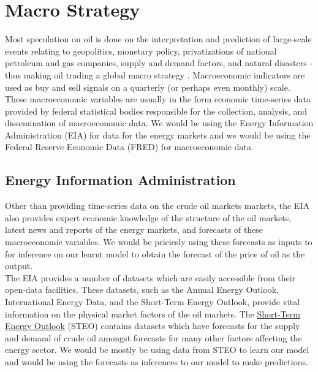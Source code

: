 \section{Macro Strategy}

Most speculation on oil is done on the interpretation and prediction of large-scale events relating to geopolitics, monetary policy, privatizations of national petroleum and gas companies, supply and demand factors, and natural disasters - thus making oil trading a global macro strategy \cite{ecoact}. Macroeconomic indicators are used as buy and sell signals on a quarterly (or perhaps even monthly) scale.  \\

These macroeconomic variables are usually in the form economic time-series data provided by federal statistical bodies responsible for the collection, analysis, and dissemination of macroeconomic data. We would be using the Energy Information Administration (EIA) for data for the energy markets and we would be using the Federal Reserve Economic Data (FRED) for macroeconomic data. \\


\subsection{Energy Information Administration}

Other than providing time-series data on the crude oil markets markets, the EIA also provides expert economic knowledge of the structure of the oil markets, latest news and reports of the energy markets, and forecasts of these macroeconomic variables. We would be priciesly using these forecasts as inputs to for inference on our learnt model to obtain the forecast of the price of oil as the output. \\

The EIA provides a number of datasets which are easily accessible from their open-data facilities. These datasets, such as the Annual Energy Outlook, International Energy Data, and the Short-Term Energy Outlook, provide vital information on the physical market factors of the oil markets. The \href{https://www.eia.gov/outlooks/steo/}{Short-Term Energy Outlook} (STEO) contains datasets which have forecasts for the supply and demand of crude oil amongst forecasts for many other factors affecting the energy sector. We would be mostly be using data from STEO to learn our model and would be using the forecasts as inferences to our model to make predictions. \\

